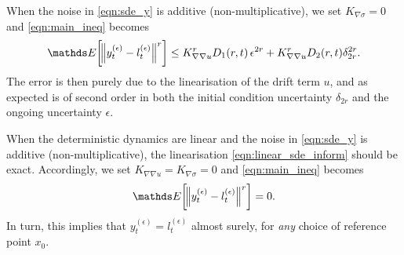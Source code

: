 \begin{remark}\label{rem:bound_additive}
	When the noise in \eqref{eqn:sde_y} is additive (non-multiplicative), we set \(K_{\nabla\sigma} = 0\) and \eqref{eqn:main_ineq} becomes
	\[
		\avg{\norm{y_t^{(\epsilon)} - l_t^{(\epsilon)}}^r} \leq   K_{\nabla\nabla u}^r D_1(r,t)\, \epsilon^{2r} + K_{\nabla\nabla u}^r D_2(r,t)\delta_{2r}^{2r}.
	\]
	The error is then purely due to the linearisation of the drift term \(u\), and as expected is of second order in both the initial condition uncertainty \(\delta_{2r}\) and the ongoing uncertainty \(\epsilon\).
\end{remark}

\begin{remark}\label{rem:bound_exact}
	When the deterministic dynamics are linear and the noise in \eqref{eqn:sde_y} is additive (non-multiplicative), the linearisation \eqref{eqn:linear_sde_inform} should be exact.
	Accordingly, we set \(K_{\nabla\nabla u} = K_{\nabla\sigma} = 0\) and \eqref{eqn:main_ineq} becomes
	\[
		\avg{\norm{y_t^{(\epsilon)} - l_t^{(\epsilon)}}^r} = 0.
	\]
	In turn, this implies that \(y_t^{(\epsilon)} = l_t^{(\epsilon)}\) almost surely, for \emph{any} choice of reference point \(x_0\).
\end{remark}



